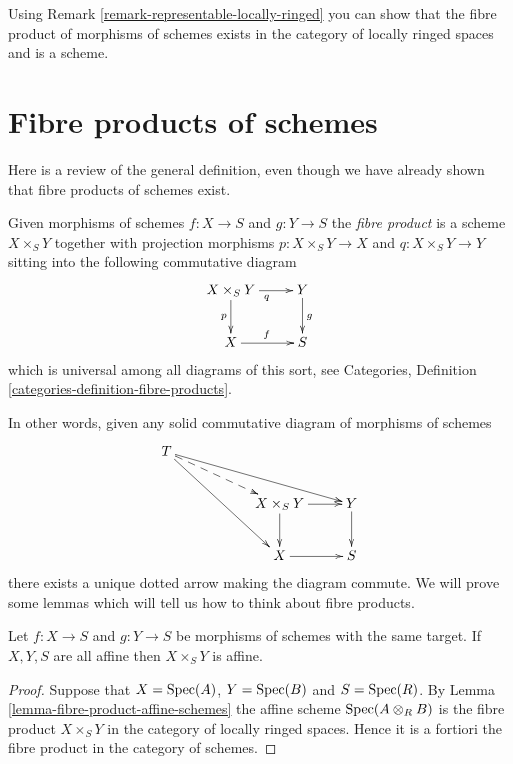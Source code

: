 \begin{remark}
\label{remark-fibre-product-schemes-locally-ringed}
Using Remark \ref{remark-representable-locally-ringed}
you can show that the fibre product of morphisms of schemes
exists in the category of locally ringed spaces and is a
scheme.
\end{remark}




\section{Fibre products of schemes}
\label{section-fibre-products}

\noindent
Here is a review of the general definition, even though
we have already shown that fibre products of schemes exist.

\begin{definition}
\label{definition-fibre-product}
Given morphisms of schemes $f : X \to S$ and $g : Y \to S$
the {\it fibre product} is a scheme $X \times_S Y$ together
with projection morphisms $p : X \times_S Y \to X$
and $q : X \times_S Y \to Y$ sitting into the following
commutative diagram
$$
\xymatrix{
X \times_S Y \ar[r]_q \ar[d]_p & Y \ar[d]^g \\
X \ar[r]^f & S
}
$$
which is universal among all diagrams of this sort,
see Categories, Definition \ref{categories-definition-fibre-products}.
\end{definition}

\noindent
In other words, given any solid commutative diagram of
morphisms of schemes
$$
\xymatrix{
T \ar[rrrd] \ar@{-->}[rrd] \ar[rrdd]
&
&
\\
&
&
X \times_S Y \ar[d] \ar[r]
&
Y \ar[d]
\\
&
&
X \ar[r]
&
S
}
$$
there exists a unique dotted arrow making the diagram commute.
We will prove some lemmas which will tell us how to think about
fibre products.

\begin{lemma}
\label{lemma-fibre-product-affines}
Let $f : X \to S$ and $g : Y \to S$ be morphisms of schemes
with the same target. If $X, Y, S$ are all affine then
$X \times_S Y$ is affine.
\end{lemma}

\begin{proof}
Suppose that $X = \mathop{\rm Spec}(A)$, $Y = \mathop{\rm Spec}(B)$
and $S = \mathop{\rm Spec}(R)$. By Lemma \ref{lemma-fibre-product-affine-schemes}
the affine scheme $\mathop{\rm Spec}(A \otimes_R B)$
is the fibre product $X \times_S Y$ in the category
of locally ringed spaces. Hence it is a fortiori the
fibre product in the category of schemes.
\end{proof}

